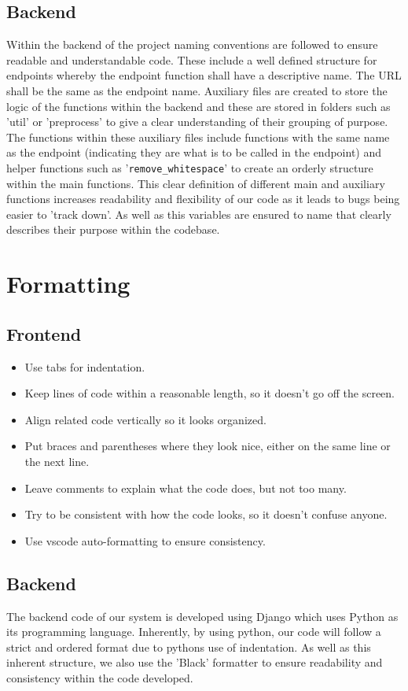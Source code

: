\documentclass[12pt]{article}
\begin{document}
\subsection{Backend}
Within the backend of the project naming conventions are followed to ensure readable and understandable code. These include a well defined structure for endpoints whereby the endpoint function shall have a descriptive name. The URL shall be the same as the endpoint name. Auxiliary files are created to store the logic of the functions within the backend and these are stored in folders such as 'util' or 'preprocess' to give a clear understanding of their grouping of purpose. The functions within these auxiliary files include functions with the same name as the endpoint (indicating they are what is to be called in the endpoint) and helper functions such as '\texttt{remove\_whitespace}' to create an orderly structure within the main functions. This clear definition of different main and auxiliary functions increases readability and flexibility of our code as it leads to bugs being easier to 'track down'. As well as this variables are ensured to name that clearly describes their purpose within the codebase.

\newpage
\section{Formatting}
\subsection{Frontend}

\begin{itemize}
    \item Use tabs for indentation.
    \item Keep lines of code within a reasonable length, so it doesn't go off the screen.
    \item Align related code vertically so it looks organized.
    \item Put braces and parentheses where they look nice, either on the same line or the next line.
    \item Leave comments to explain what the code does, but not too many.
    \item Try to be consistent with how the code looks, so it doesn't confuse anyone.
    \item Use vscode auto-formatting to ensure consistency.
  \end{itemize}

\subsection{Backend}
The backend code of our system is developed using Django which uses Python as its programming language. Inherently, by using python, our code will follow a strict and ordered format due to pythons use of indentation. As well as this inherent structure, we also use the 'Black' formatter to ensure readability and consistency within the code developed.
\end{document}
